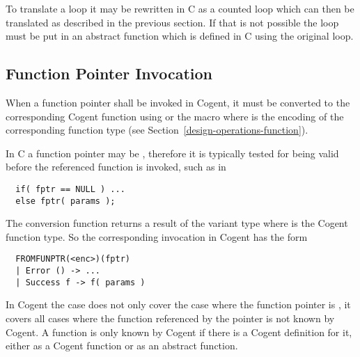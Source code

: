 To translate a  loop it may be rewritten in C as a counted  loop which can then be translated 
as described in the previous section. If that is not possible the loop must be put in an abstract function which is 
defined in C using the original  loop.

\subsection{Function Pointer Invocation}
\label{app-transfunction-pointer}

When a function pointer  shall be invoked in Cogent, it must be converted to the corresponding Cogent function
using  or the macro  where  is the encoding of the 
corresponding function type (see Section~\ref{design-operations-function}).

In C a function pointer may be , therefore it is typically tested for being valid before the
referenced function is invoked, such as in 
\begin{verbatim}
  if( fptr == NULL ) ...
  else fptr( params );
\end{verbatim}
The conversion function  returns a result of the variant type  where  is the 
Cogent function type. So the corresponding invocation in Cogent has the form
\begin{verbatim}
  FROMFUNPTR(<enc>)(fptr)
  | Error () -> ...
  | Success f -> f( params )
\end{verbatim}

In Cogent the  case does not only cover the case where the function pointer is , it covers
all cases where the function referenced by the pointer is not known by Cogent. A function is only known by Cogent
if there is a Cogent definition for it, either as a Cogent function or as an abstract function.

